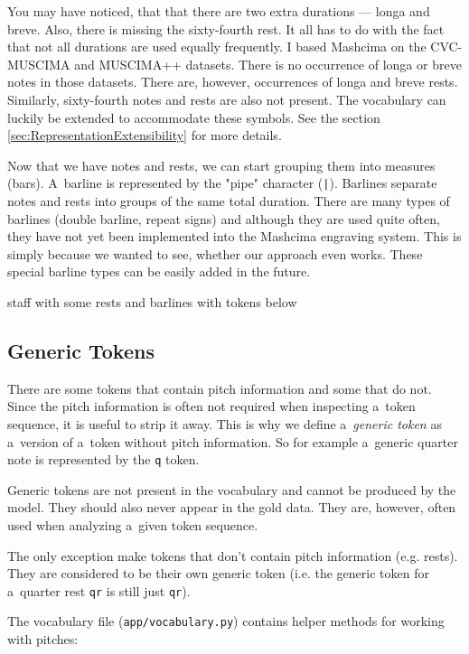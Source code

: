 You may have noticed, that that there are two extra durations --- longa and breve. Also, there is missing the sixty-fourth rest. It all has to do with the fact that not all durations are used equally frequently. I based Mashcima on the CVC-MUSCIMA and MUSCIMA++ datasets. There is no occurrence of longa or breve notes in those datasets. There are, however, occurrences of longa and breve rests. Similarly, sixty-fourth notes and rests are also not present. The vocabulary can luckily be extended to accommodate these symbols. See the section \ref{sec:RepresentationExtensibility} for more details.

Now that we have notes and rests, we can start grouping them into measures (bars). A~barline is represented by the "pipe" character (\texttt{|}). Barlines separate notes and rests into groups of the same total duration. There are many types of barlines (double barline, repeat signs) and although they are used quite often, they have not yet been implemented into the Mashcima engraving system. This is simply because we wanted to see, whether our approach even works. These special barline types can be easily added in the future.

\begin{code}
staff with some rests and barlines
with tokens below
\end{code}


\subsection{Generic Tokens}

There are some tokens that contain pitch information and some that do not. Since the pitch information is often not required when inspecting a~token sequence, it is useful to strip it away. This is why we define a~\emph{generic token} as a~version of a~token without pitch information. So for example a~generic quarter note is represented by the \texttt{q} token.

Generic tokens are not present in the vocabulary and cannot be produced by the model. They should also never appear in the gold data. They are, however, often used when analyzing a~given token sequence.

The only exception make tokens that don't contain pitch information (e.g. rests). They are considered to be their own generic token (i.e. the generic token for a~quarter rest \texttt{qr} is still just \texttt{qr}).

The vocabulary file (\texttt{app/vocabulary.py}) contains helper methods for working with pitches:

